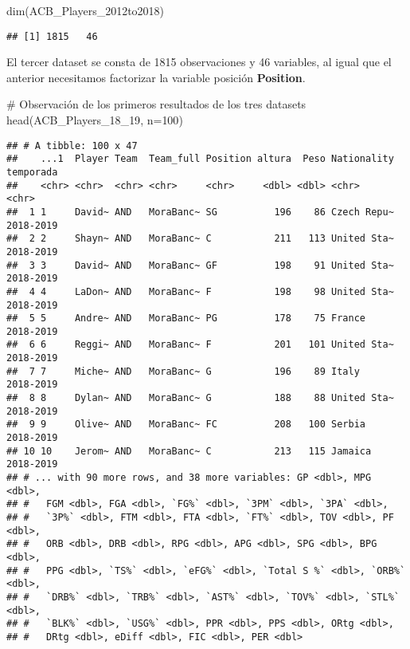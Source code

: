 \documentclass[]{article}
\newenvironment{Shaded}{\begin{snugshade}}{\end{snugshade}}
\newcommand{\KeywordTok}[1]{\textcolor[rgb]{0.94,0.87,0.69}{#1}}
\newcommand{\DataTypeTok}[1]{\textcolor[rgb]{0.87,0.87,0.75}{#1}}
\newcommand{\DecValTok}[1]{\textcolor[rgb]{0.86,0.86,0.80}{#1}}
\newcommand{\CommentTok}[1]{\textcolor[rgb]{0.50,0.62,0.50}{#1}}
\newcommand{\NormalTok}[1]{\textcolor[rgb]{0.80,0.80,0.80}{#1}}
\begin{document}
\begin{Shaded}
\begin{Highlighting}[]
\KeywordTok{dim}\NormalTok{(ACB_Players_2012to2018)}
\end{Highlighting}
\end{Shaded}

\begin{verbatim}
## [1] 1815   46
\end{verbatim}

El tercer dataset se consta de 1815 observaciones y 46 variables, al
igual que el anterior necesitamos factorizar la variable posición
\textbf{Position}.

\begin{Shaded}
\begin{Highlighting}[]
\CommentTok{# Observación de los primeros resultados de los tres datasets}
\KeywordTok{head}\NormalTok{(ACB_Players_18_}\DecValTok{19}\NormalTok{, }\DataTypeTok{n=}\DecValTok{100}\NormalTok{)}
\end{Highlighting}
\end{Shaded}

\begin{verbatim}
## # A tibble: 100 x 47
##    ...1  Player Team  Team_full Position altura  Peso Nationality temporada
##    <chr> <chr>  <chr> <chr>     <chr>     <dbl> <dbl> <chr>       <chr>    
##  1 1     David~ AND   MoraBanc~ SG          196    86 Czech Repu~ 2018-2019
##  2 2     Shayn~ AND   MoraBanc~ C           211   113 United Sta~ 2018-2019
##  3 3     David~ AND   MoraBanc~ GF          198    91 United Sta~ 2018-2019
##  4 4     LaDon~ AND   MoraBanc~ F           198    98 United Sta~ 2018-2019
##  5 5     Andre~ AND   MoraBanc~ PG          178    75 France      2018-2019
##  6 6     Reggi~ AND   MoraBanc~ F           201   101 United Sta~ 2018-2019
##  7 7     Miche~ AND   MoraBanc~ G           196    89 Italy       2018-2019
##  8 8     Dylan~ AND   MoraBanc~ G           188    88 United Sta~ 2018-2019
##  9 9     Olive~ AND   MoraBanc~ FC          208   100 Serbia      2018-2019
## 10 10    Jerom~ AND   MoraBanc~ C           213   115 Jamaica     2018-2019
## # ... with 90 more rows, and 38 more variables: GP <dbl>, MPG <dbl>,
## #   FGM <dbl>, FGA <dbl>, `FG%` <dbl>, `3PM` <dbl>, `3PA` <dbl>,
## #   `3P%` <dbl>, FTM <dbl>, FTA <dbl>, `FT%` <dbl>, TOV <dbl>, PF <dbl>,
## #   ORB <dbl>, DRB <dbl>, RPG <dbl>, APG <dbl>, SPG <dbl>, BPG <dbl>,
## #   PPG <dbl>, `TS%` <dbl>, `eFG%` <dbl>, `Total S %` <dbl>, `ORB%` <dbl>,
## #   `DRB%` <dbl>, `TRB%` <dbl>, `AST%` <dbl>, `TOV%` <dbl>, `STL%` <dbl>,
## #   `BLK%` <dbl>, `USG%` <dbl>, PPR <dbl>, PPS <dbl>, ORtg <dbl>,
## #   DRtg <dbl>, eDiff <dbl>, FIC <dbl>, PER <dbl>
\end{verbatim}
\end{document}

